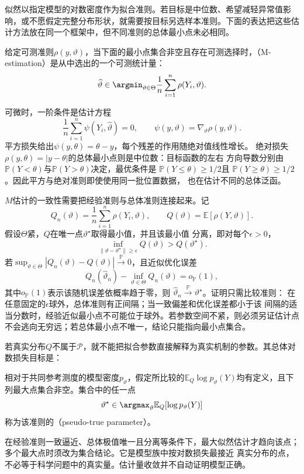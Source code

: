 似然以指定模型的对数密度作为拟合准则。若目标是中位数、希望减轻异常值影响，或不愿假定完整分布形状，就需要按目标另选样本准则。下面的表达把这些估计方法放在同一个框架中，但不同准则的总体最小点未必相同。
\begin{definition}[M估计]
  \label{def:statistics-m-estimator}
给定可测准则\(\rho(y,\vartheta)\)，当下面的最小点集合非空且存在可测选择时，（M-estimation）是从中选出的一个可测统计量：
\[
  \widehat\vartheta
  \in\argmin_{\vartheta\in\Theta}
  \frac1n\sum_{i=1}^n\rho(Y_i,\vartheta).
\]
\end{definition}
可微时，一阶条件是估计方程
\[
  \frac1n\sum_{i=1}^n\psi(Y_i,\widehat\vartheta)=0,
  \qquad
  \psi(y,\vartheta)=\nabla_\vartheta\rho(y,\vartheta).
\]
平方损失给出\(\psi(y,\theta)=\theta-y\)，每个残差的作用随绝对值线性增长。
绝对损失\(\rho(y,\theta)=|y-\theta|\)的总体最小点则是中位数：目标函数的左右
方向导数分别由\(\mathbb{P}(Y<\theta)\)与\(\mathbb{P}(Y>\theta)\)决定，最优条件是
\(\mathbb{P}(Y\leq\theta)\geq1/2\)且
\(\mathbb{P}(Y\geq\theta)\geq1/2\)。因此平方与绝对准则即使使用同一批位置数据，
也在估计不同的总体泛函。

\(M\)估计的一致性需要把经验准则与总体准则连接起来。记
\[
  Q_n(\vartheta)=\frac1n\sum_{i=1}^n\rho(Y_i,\vartheta),
  \qquad
  Q(\vartheta)=\mathbb{E}[\rho(Y,\vartheta)].
\]
假设\(\Theta\)紧，\(Q\)在唯一点\(\vartheta^\star\)取得最小值，并且该最小值
分离，即对每个\(\epsilon>0\)，
\[
  \inf_{\lVert\vartheta-\vartheta^\star\rVert\geq\epsilon}
  Q(\vartheta)>Q(\vartheta^\star).
\]
若\(\sup_{\vartheta\in\Theta}|Q_n(\vartheta)-Q(\vartheta)|
\xrightarrow{\mathbb{P}}0\)，且近似优化误差
\[
  Q_n(\widehat\vartheta_n)-\inf_{\vartheta\in\Theta}Q_n(\vartheta)
  =o_{\mathbb{P}}(1),
\]
其中\(o_{\mathbb{P}}(1)\)表示该随机误差依概率趋于零，则
\(\widehat\vartheta_n\xrightarrow{\mathbb{P}}\vartheta^\star\)。证明只需比较准则：
在任意固定的\(\epsilon\)球外，总体准则有正间隔；当一致偏差和优化误差都小于该
间隔的适当分数时，经验近似最小点不可能位于球外。若参数空间不紧，则必须另证估计点
不会逃向无穷远；若总体最小点不唯一，结论只能指向最小点集合。

若真实分布\(Q\)不属于\(\mathcal P\)，就不能把拟合参数直接解释为真实机制的参数。其总体对数损失目标是：
\begin{definition}[伪真参数]
  \label{def:statistics-pseudo-true-parameter}
相对于共同参考测度的模型密度\(p_\vartheta\)，假定所比较的\(\mathbb E_Q\log p_\vartheta(Y)\)均有定义，且下列最大点集合非空。集合中的任一点
\[
  \vartheta^\star
  \in\argmax_\vartheta\mathbb{E}_Q[\log p_\vartheta(Y)]
\]
称为该准则的（pseudo-true parameter）。
\end{definition}
在经验准则一致逼近、总体极值唯一且分离等条件下，最大似然估计才趋向该点；多个最大点时须改为集合结论。它是模型族中按对数损失最接近
真实分布的点，不必等于科学问题中的真实量。估计量收敛并不自动证明模型正确。

